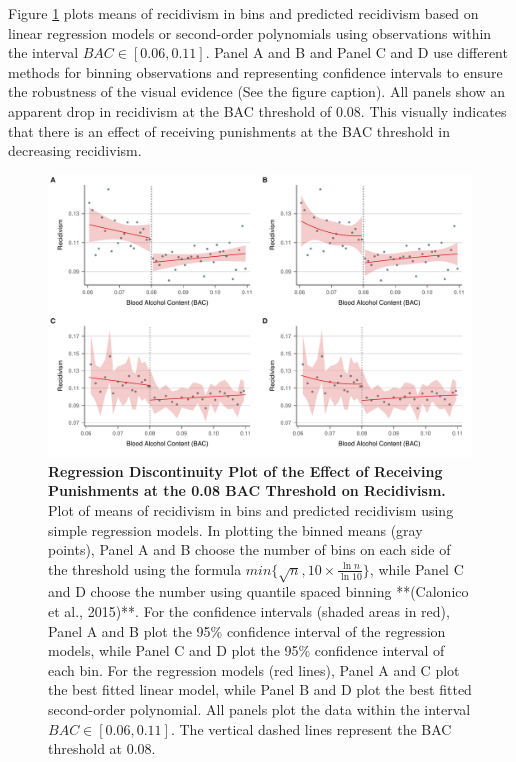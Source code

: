 \documentclass[
  11pt,
]{article}
\begin{document}
\endgroup

Figure \ref{fig:rdplot} plots means of recidivism in bins and predicted
recidivism based on linear regression models or second-order polynomials
using observations within the interval \(BAC \in [0.06, 0.11]\). Panel A
and B and Panel C and D use different methods for binning observations
and representing confidence intervals to ensure the robustness of the
visual evidence (See the figure caption). All panels show an apparent
drop in recidivism at the BAC threshold of 0.08. This visually indicates
that there is an effect of receiving punishments at the BAC threshold in
decreasing recidivism.

\begin{figure}[H]
  \centering
  \includegraphics[width=1\columnwidth]{../figures/combined.pdf}
  \caption{\textbf{Regression Discontinuity Plot of the Effect of Receiving Punishments at the 0.08 BAC Threshold on Recidivism.} Plot of means of recidivism in bins and predicted recidivism using simple regression models. In plotting the binned means (gray points), Panel A and B choose the number of bins on each side of the threshold using the formula $min\{\sqrt{n}, 10 \times \frac{\ln{n}}{\ln{10}}\}$, while Panel C and D choose the number using quantile spaced binning **(Calonico et al., 2015)**. For the confidence intervals (shaded areas in red), Panel A and B plot the 95\% confidence interval of the regression models, while Panel C and D plot the 95\% confidence interval of each bin. For the regression models (red lines), Panel A and C plot the best fitted linear model, while Panel B and D plot the best fitted second-order polynomial. All panels plot the data within the interval $BAC \in [0.06, 0.11]$. The vertical dashed lines represent the BAC threshold at 0.08.}
  \label{fig:rdplot}
\end{figure}
\end{document}
